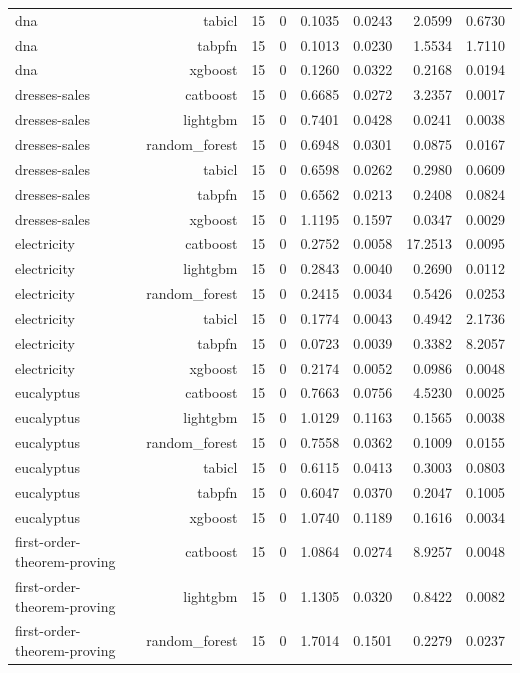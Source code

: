 \begin{table}[htbp]
\begin{tabular}{lrrrrrrr}
dna & tabicl & 15 & 0 & 0.1035 & 0.0243 & 2.0599 & 0.6730 \\
dna & tabpfn & 15 & 0 & 0.1013 & 0.0230 & 1.5534 & 1.7110 \\
dna & xgboost & 15 & 0 & 0.1260 & 0.0322 & 0.2168 & 0.0194 \\
dresses-sales & catboost & 15 & 0 & 0.6685 & 0.0272 & 3.2357 & 0.0017 \\
dresses-sales & lightgbm & 15 & 0 & 0.7401 & 0.0428 & 0.0241 & 0.0038 \\
dresses-sales & random\_forest & 15 & 0 & 0.6948 & 0.0301 & 0.0875 & 0.0167 \\
dresses-sales & tabicl & 15 & 0 & 0.6598 & 0.0262 & 0.2980 & 0.0609 \\
dresses-sales & tabpfn & 15 & 0 & 0.6562 & 0.0213 & 0.2408 & 0.0824 \\
dresses-sales & xgboost & 15 & 0 & 1.1195 & 0.1597 & 0.0347 & 0.0029 \\
electricity & catboost & 15 & 0 & 0.2752 & 0.0058 & 17.2513 & 0.0095 \\
electricity & lightgbm & 15 & 0 & 0.2843 & 0.0040 & 0.2690 & 0.0112 \\
electricity & random\_forest & 15 & 0 & 0.2415 & 0.0034 & 0.5426 & 0.0253 \\
electricity & tabicl & 15 & 0 & 0.1774 & 0.0043 & 0.4942 & 2.1736 \\
electricity & tabpfn & 15 & 0 & 0.0723 & 0.0039 & 0.3382 & 8.2057 \\
electricity & xgboost & 15 & 0 & 0.2174 & 0.0052 & 0.0986 & 0.0048 \\
eucalyptus & catboost & 15 & 0 & 0.7663 & 0.0756 & 4.5230 & 0.0025 \\
eucalyptus & lightgbm & 15 & 0 & 1.0129 & 0.1163 & 0.1565 & 0.0038 \\
eucalyptus & random\_forest & 15 & 0 & 0.7558 & 0.0362 & 0.1009 & 0.0155 \\
eucalyptus & tabicl & 15 & 0 & 0.6115 & 0.0413 & 0.3003 & 0.0803 \\
eucalyptus & tabpfn & 15 & 0 & 0.6047 & 0.0370 & 0.2047 & 0.1005 \\
eucalyptus & xgboost & 15 & 0 & 1.0740 & 0.1189 & 0.1616 & 0.0034 \\
first-order-theorem-proving & catboost & 15 & 0 & 1.0864 & 0.0274 & 8.9257 & 0.0048 \\
first-order-theorem-proving & lightgbm & 15 & 0 & 1.1305 & 0.0320 & 0.8422 & 0.0082 \\
first-order-theorem-proving & random\_forest & 15 & 0 & 1.7014 & 0.1501 & 0.2279 & 0.0237 \\

\end{tabular}
\end{table}
